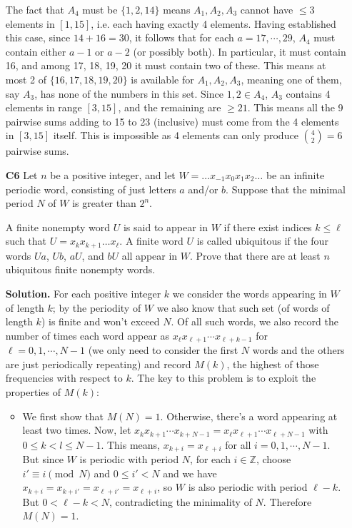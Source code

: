 \documentclass[11pt,a4paper]{article}
\begin{document}
\begin{enumerate}
	The fact that $A_4$ must be $\{1, 2, 14\}$ means $A_1, A_2, A_3$ cannot have $\le 3$ elements in $[1, 15]$, 
	i.e. each having exactly 4 elements. 
	Having established this case, since $14 + 16 = 30$, it follows that for each $a = 17, \cdots, 29$, $A_4$ must contain either $a - 1$ or $a - 2$ (or possibly both). 
	In particular, it must contain 16, 
	and among 17, 18, 19, 20 it must contain two of these. 
	This means at most 2 of $\{16, 17, 18, 19, 20\}$ is available for $A_1, A_2, A_3$, 
	meaning one of them, say $A_3$, has none of the numbers in this set. 
	Since $1, 2\in A_4$, 
	$A_3$ contains 4 elements in range $[3, 15]$, and the remaining are $\ge 21$. 
	This means all the 9 pairwise sums adding to 15 to 23 (inclusive) must come from the 4 elements in $[3, 15]$ itself. 
	This is impossible as 4 elements can only produce $\binom{4}{2}=6$ pairwise sums. 
	
	\item[\textbf{C6}] Let $n$ be a positive integer, and let $W = \ldots x_{-1}x_0x_1x_2 \ldots$ be an infinite periodic word, consisting of just letters $a$ and/or $b$. Suppose that the minimal period $N$ of $W$ is greater than $2^n$.
	
	A finite nonempty word $U$ is said to appear in $W$ if there exist indices $k \leq \ell$ such that $U=x_k x_{k+1} \ldots x_{\ell}$. A finite word $U$ is called ubiquitous if the four words $Ua$, $Ub$, $aU$, and $bU$ all appear in $W$. Prove that there are at least $n$ ubiquitous finite nonempty words.
	
	\textbf{Solution.} For each positive integer $k$ we consider the words appearing in $W$ of length $k$; by the periodity of $W$ we also know that such set (of words of length $k$) is finite and won't exceed $N$. Of all such words, we also record the number of times each word appear as $x_{\ell}x_{\ell+1}\cdots x_{\ell+k-1}$ for $\ell=0, 1, \cdots , N-1$ (we only need to consider the first $N$ words and the others are just periodically repeating) and record $M(k)$, the highest of those frequencies with respect to $k$. The key to this problem is to exploit the properties of $M(k)$: 
	\begin{itemize}
		\item We first show that $M(N)=1$. Otherwise, there's a word appearing at least two times. Now, let $x_{k}x_{k+1}\cdots x_{k+N-1}=x_{\ell}x_{\ell+1}\cdots x_{\ell+N-1}$ with $0\le k<l\le N-1$. 
		This means, $x_{k+i}=x_{\ell+i}$ for all $i=0, 1, \cdots , N-1$. But since $W$ is periodic with period $N$, for each $i\in\mathbb{Z}$, choose $i'\equiv i\pmod{N}$ and $0\le i'<N$ and we have 
		$x_{k+i}=x_{k+i'}=x_{\ell+i'}=x_{\ell+i}$, so $W$ is also periodic with period $\ell-k$. But $0<\ell-k<N$, contradicting the minimality of $N$. Therefore $M(N)=1$. 
		

\end{itemize}
\end{enumerate}
\end{document}
